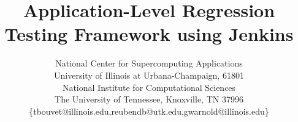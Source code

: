 \documentclass[10pt, conference, compsocconf]{IEEEtran}
\begin{document}
\title{Application-Level Regression Testing Framework using Jenkins}





%
\author{
National Center for Supercomputing Applications\\
University of Illinois at Urbana-Champaign, 61801\\
National Institute for Computational Sciences\\
The University of Tennessee, Knoxville, TN 37996\\
\{tbouvet@illinois.edu,reubendb@utk.edu,gwarnold@illinois.edu\}}





\maketitle
\thispagestyle{plain}
\end{document}
